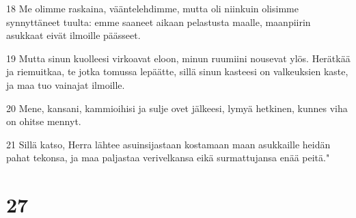 \par 18 Me olimme raskaina, vääntelehdimme, mutta oli niinkuin olisimme synnyttäneet tuulta: emme saaneet aikaan pelastusta maalle, maanpiirin asukkaat eivät ilmoille päässeet.
\par 19 Mutta sinun kuolleesi virkoavat eloon, minun ruumiini nousevat ylös. Herätkää ja riemuitkaa, te jotka tomussa lepäätte, sillä sinun kasteesi on valkeuksien kaste, ja maa tuo vainajat ilmoille.
\par 20 Mene, kansani, kammioihisi ja sulje ovet jälkeesi, lymyä hetkinen, kunnes viha on ohitse mennyt.
\par 21 Sillä katso, Herra lähtee asuinsijastaan kostamaan maan asukkaille heidän pahat tekonsa, ja maa paljastaa verivelkansa eikä surmattujansa enää peitä."

\chapter{27}


